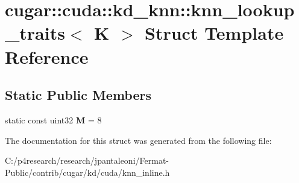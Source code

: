 \hypertarget{structcugar_1_1cuda_1_1kd__knn_1_1knn__lookup__traits}{}\section{cugar\+:\+:cuda\+:\+:kd\+\_\+knn\+:\+:knn\+\_\+lookup\+\_\+traits$<$ K $>$ Struct Template Reference}
\label{structcugar_1_1cuda_1_1kd__knn_1_1knn__lookup__traits}
\subsection*{Static Public Members}
\begin{DoxyCompactItemize}
\item 
\mbox{\label{structcugar_1_1cuda_1_1kd__knn_1_1knn__lookup__traits_aace31b4632e7539c867ba9b6d7866061}} 
static const uint32 {\bfseries M} = 8
\end{DoxyCompactItemize}


The documentation for this struct was generated from the following file\+:\begin{DoxyCompactItemize}
\item 
C\+:/p4research/research/jpantaleoni/\+Fermat-\/\+Public/contrib/cugar/kd/cuda/knn\+\_\+inline.\+h\end{DoxyCompactItemize}

